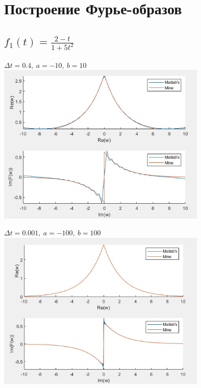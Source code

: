 \documentclass{article}
\begin{document}
{\Large\bfseries\section{Построение Фурье-образов}}
{\large\subsection{$f_1(t) = \frac{2-t}{1+5t^2}$}}
\begin{center}
  $\Delta t = 0.4,\ a = -10,\ b = 10$
  \includegraphics[width = 10cm, height 10cm]{f1_1.jpg}
  \vspace{1cm}
  
  $\Delta t = 0.001,\ a = -100,\ b = 100$
  \includegraphics[width = 10cm, height 10cm]{f1_2.jpg}
\end{center}

\newpage
\end{document}
